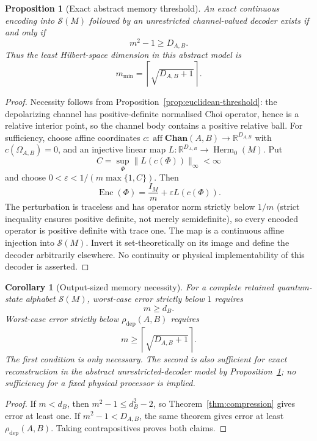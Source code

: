 \documentclass[11pt,a4paper]{article}
\theoremstyle{definition}
\theoremstyle{plain}
\newtheorem{proposition}[theorem]{Proposition}
\newtheorem{corollary}[theorem]{Corollary}
\theoremstyle{remark}
\DeclareMathOperator{\Herm}{Herm}
\newcommand{\Chan}{\mathbf{Chan}}
\newcommand{\Sstate}{\mathcal{S}}
\newcommand{\rhodep}{\rho_{\mathrm{dep}}}
\begin{document}
\begin{proposition}[Exact abstract memory threshold]
\label{prop:memory-sharpness}
An exact continuous encoding into $\Sstate(M)$ followed by an unrestricted
channel-valued decoder exists if and only if
\[
m^2-1\geq D_{A,B}.
\]
Thus the least Hilbert-space dimension in this abstract model is
\[
m_{\min}=\left\lceil\sqrt{D_{A,B}+1}\right\rceil.
\]
\end{proposition}

\begin{proof}
Necessity follows from Proposition~\ref{prop:euclidean-threshold}: the depolarizing channel has positive-definite normalised Choi operator, hence is a relative interior point, so the channel body contains a positive relative ball.
For sufficiency, choose affine coordinates
$c:\operatorname{aff}\Chan(A,B)\to\mathbb R^{D_{A,B}}$ with
$c(\Omega_{A,B})=0$, and an injective linear map
$L:\mathbb R^{D_{A,B}}\to\Herm_0(M)$. Put
\[
C=\sup_\Phi\|L(c(\Phi))\|_\infty<\infty
\]
and choose $0<\varepsilon<1/(m\max\{1,C\})$. Then
\[
\operatorname{Enc}(\Phi)=\frac{I_M}{m}+\varepsilon L(c(\Phi)).
\]
The perturbation is traceless and has operator norm strictly below $1/m$ (strict inequality ensures positive definite, not merely semidefinite),
so every encoded operator is positive definite with trace one. The map is
a continuous affine injection into $\Sstate(M)$. Invert it set-theoretically
on its image and define the decoder arbitrarily elsewhere. No continuity or
physical implementability of this decoder is asserted.
\end{proof}

\begin{corollary}[Output-sized memory necessity]
\label{cor:accuracy-memory}
For a complete retained quantum-state alphabet $\Sstate(M)$, worst-case
error strictly below $1$ requires
\[
m\geq d_B.
\]
Worst-case error strictly below $\rhodep(A,B)$ requires
\[
m\geq\left\lceil\sqrt{D_{A,B}+1}\right\rceil.
\]
The first condition is only necessary. The second is also sufficient for
exact reconstruction in the abstract unrestricted-decoder model by
Proposition~\ref{prop:memory-sharpness}; no sufficiency for a fixed physical
processor is implied.
\end{corollary}

\begin{proof}
If $m<d_B$, then
$m^2-1\leq d_B^2-2$, so Theorem~\ref{thm:compression} gives error at least
one. If $m^2-1<D_{A,B}$, the same theorem gives error at least
$\rhodep(A,B)$. Taking contrapositives proves both claims.
\end{proof}
\end{document}

